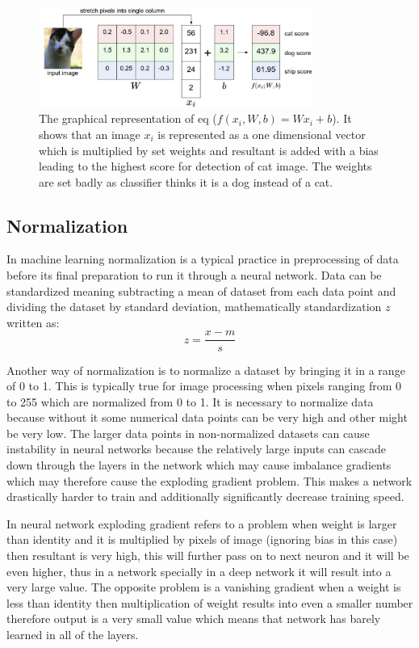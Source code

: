 \documentclass[11pt]{article}
\begin{document}
\begin{figure}[H]
	\centering
	\includegraphics[width=90mm,height=33mm,  scale=0.8]{files/cnn_architecture/linear_class.png}
	\caption{The graphical representation of eq 
		($f(x_i, W, b) = Wx_i + b$). It shows that an image $x_i$ is represented as a one dimensional vector which is multiplied by set weights and resultant is added with a bias leading to the highest score for detection of cat image. The weights are set badly as classifier thinks it is a dog instead of a cat.}
	\label{fig: linear classifier}
\end{figure}

\subsection{Normalization}
In machine learning normalization is a typical practice in preprocessing of data before its final preparation to run it through a neural network. Data can be standardized meaning subtracting a mean of dataset from each data point and dividing the dataset by standard deviation, mathematically standardization $z$ written as:
$$ z = \dfrac{x-m}{s}$$

Another way of normalization is to normalize a dataset by bringing it in a range of 0 to 1. This is typically true for image processing when pixels ranging from 0 to 255 which are normalized from 0 to 1. It is necessary to normalize data because without it some numerical data points can be very high and other might be very low. The larger data points in non-normalized datasets can cause instability in neural networks because the relatively large inputs can cascade down through the layers in the network which may cause imbalance gradients which may therefore cause the exploding gradient problem. This makes a network drastically harder to train and additionally significantly decrease training speed.

In neural network exploding gradient refers to a problem when weight is larger than identity and it is multiplied by pixels of image (ignoring bias in this case) then resultant is very high, this will further pass on to next neuron and it will be even higher, thus in a network specially in a deep network it will result into a very large value. The opposite problem is a vanishing gradient when a weight is less than identity then multiplication of weight results into even a smaller number therefore output is a very small value which means that network has barely learned in all of the layers.
\end{document}
